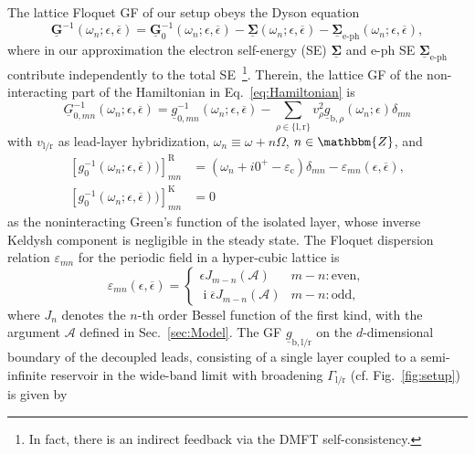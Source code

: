 \documentclass[aps,prb,groupedaddress,showpacs,twocolumn,superscriptaddress,10pt]{revtex4-2}
\DeclareMathOperator*{\ii}{i} %
\newcommand{\mat}[1]{\bm{#1}} %
\newcommand{\kel}[1]{\underline{#1}} %
\newcommand{\aamp}{\mathcal{A}}
\begin{document}
The lattice Floquet GF of our setup obeys the Dyson equation 
% 
\begin{equation}\label{eq:FullDysonEq}
\kel{\mat{G}}^{-1}(\omega_n;\epsilon,\overline{\epsilon}) = \kel{\mat{G}}^{-1}_{0}(\omega_n;\epsilon,\overline{\epsilon}) - \kel{\mat{\Sigma}}(\omega_n;\epsilon,\overline{\epsilon}) - \kel{\mat{\Sigma}}_{\text{e-ph}}(\omega_n;\epsilon,\overline{\epsilon}),
\end{equation}
% 
where in our approximation the electron self-energy (SE) $ \kel{\mat{\Sigma}}$ and e-ph SE $\kel{\mat{\Sigma}}_{\text{e-ph}}$ contribute independently to the total SE~\footnote{In fact, there is an indirect feedback via the DMFT self-consistency.}. Therein, the lattice GF of the non-interacting part of the Hamiltonian in Eq.~\eqref{eq:Hamiltonian} is 
% 
\begin{equation}\label{eq:non-int_InvGF} 
\kel{G}^{-1}_{0,mn}(\omega_n;\epsilon,\overline{\epsilon}) =  \kel{g}^{-1}_{0,mn}(\omega_n;\epsilon,\overline{\epsilon}) - \sum_{\rho\in\{\text{l},\text{r}\}}v^2_{\rho}\kel{g}_{\text{b},\rho}(\omega_n;\epsilon)\delta_{mn}
\end{equation}
% 
with $v_{\text{l}/\text{r}}$ as lead-layer hybridization, $\omega_n \equiv \omega + n\Omega$, $n\in\mathbbm{Z}$, and 
%
\begin{equation}\label{eq:inv_non-int_lat_GF_comps}
\begin{split}
\left[ g^{-1}_{0}(\omega_n;\epsilon,\overline{\epsilon})) \right]^{\text{R}}_{mn} & = \left( \omega_n + i0^{+} -\varepsilon_{\text{c}} \right)\delta_{mn} - \varepsilon_{mn}(\epsilon,\overline{\epsilon}), \\
\left[ g^{-1}_{0}(\omega_n;\epsilon,\overline{\epsilon})) \right]^{\text{K}}_{mn} & = 0
\end{split}
\end{equation}
%
as the noninteracting Green's function of the isolated layer, whose inverse Keldysh component is negligible in the steady state. The Floquet dispersion relation $\varepsilon_{mn}$ for the periodic field in a hyper-cubic lattice is~\cite{ts.ok.08} 
%
\begin{equation}
\label{eq:Floquet_disp}
\varepsilon_{mn}(\epsilon,\overline{\epsilon}) = \begin{cases}
\epsilon J_{m-n}(\aamp) & m-n:\text{even}, \\
\ii\overline{\epsilon}J_{m-n}(\aamp) & m-n:\text{odd},
\end{cases}
\end{equation} 
%  
where $J_n$ denotes the $n$-th order Bessel function of the first kind, with the argument $\aamp$ defined in Sec.~\ref{sec:Model}. The  GF $\kel{g}_{\text{b},\text{l}/\text{r}}$ on the $d$-dimensional boundary of the decoupled leads,  consisting of a single layer coupled to a semi-infinite reservoir in the wide-band limit with broadening $\Gamma_{\text{l}/\text{r}}$ (cf. Fig.~\ref{fig:setup}) is given by
\end{document}
